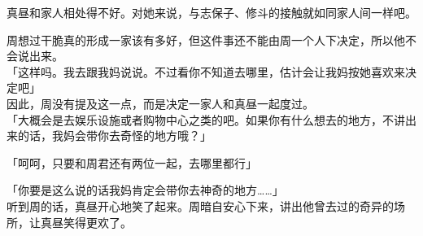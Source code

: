 真昼和家人相处得不好。对她来说，与志保子、修斗的接触就如同家人间一样吧。

周想过干脆真的形成一家该有多好，但这件事还不能由周一个人下决定，所以他不会说出来。\\

「这样吗。我去跟我妈说说。不过看你不知道去哪里，估计会让我妈按她喜欢来决定吧」\\

因此，周没有提及这一点，而是决定一家人和真昼一起度过。\\

「大概会是去娱乐设施或者购物中心之类的吧。如果你有什么想去的地方，不讲出来的话，我妈会带你去奇怪的地方哦？」

「呵呵，只要和周君还有两位一起，去哪里都行」

「你要是这么说的话我妈肯定会带你去神奇的地方……」\\

听到周的话，真昼开心地笑了起来。周暗自安心下来，讲出他曾去过的奇异的场所，让真昼笑得更欢了。
